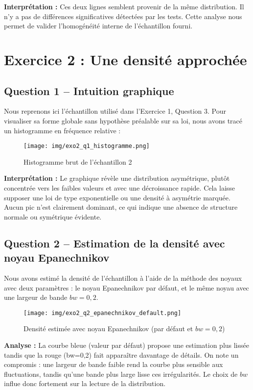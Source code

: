 \documentclass[a4paper,11pt]{article}
\begin{document}
\textbf{Interprétation :} Ces deux lignes semblent provenir de la même distribution. Il n’y a pas de différences significatives détectées par les tests. Cette analyse nous permet de valider l’homogénéité interne de l’échantillon fourni.

\newpage

\section*{Exercice 2 : Une densité approchée}

\subsection*{Question 1 – Intuition graphique}
Nous reprenons ici l’échantillon utilisé dans l’Exercice 1, Question 3. Pour visualiser sa forme globale sans hypothèse préalable sur sa loi, nous avons tracé un histogramme en fréquence relative :

\begin{figure}[H]
    \centering
    \texttt{[image: img/exo2\_q1\_histogramme.png]}
    \caption{Histogramme brut de l’échantillon 2}
\end{figure}

\textbf{Interprétation :} Le graphique révèle une distribution asymétrique, plutôt concentrée vers les faibles valeurs et avec une décroissance rapide. Cela laisse supposer une loi de type exponentielle ou une densité à asymétrie marquée. Aucun pic n’est clairement dominant, ce qui indique une absence de structure normale ou symétrique évidente.

\subsection*{Question 2 – Estimation de la densité avec noyau Epanechnikov}
Nous avons estimé la densité de l’échantillon à l’aide de la méthode des noyaux avec deux paramètres : le noyau Epanechnikov par défaut, et le même noyau avec une largeur de bande $bw = 0{,}2$.

\begin{figure}[H]
    \centering
    \texttt{[image: img/exo2\_q2\_epanechnikov\_default.png]}
    \caption{Densité estimée avec noyau Epanechnikov (par défaut et $bw=0{,}2$)}
\end{figure}

\textbf{Analyse :} La courbe bleue (valeur par défaut) propose une estimation plus lissée tandis que la rouge (bw=0,2) fait apparaître davantage de détails. On note un compromis : une largeur de bande faible rend la courbe plus sensible aux fluctuations, tandis qu'une bande plus large lisse ces irrégularités. Le choix de $bw$ influe donc fortement sur la lecture de la distribution.
\end{document}
